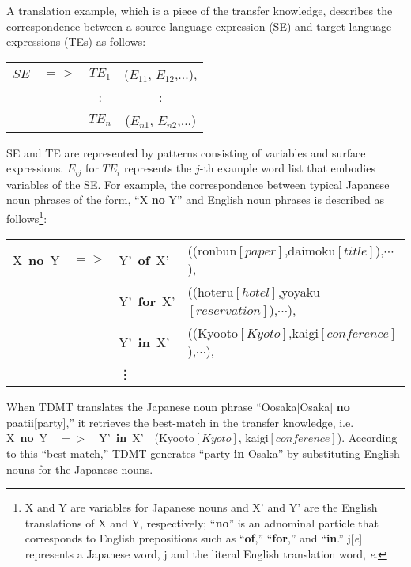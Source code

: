 A translation example, which is a piece of the transfer knowledge, 
describes the correspondence between
a source language expression (SE) and target language expressions
(TEs) as follows:

\begin{center}
\def\arraystretch{}
\begin{tabular}{cccc}
  $SE$ & $=>$ & $TE_1$ & ($E_{11}$, $E_{12}$,...), \\
     &    &  :  &  :              \\
     &    & $TE_n$ & ($E_{n1}$, $E_{n2}$,...)
\end{tabular}
\end{center}
\vspace{1ex}

SE and TE are represented by patterns consisting of 
variables and surface expressions.
 $E_{ij}$ for $TE_i$ represents the $j$-th example word list
that embodies variables of the SE.
 For example, the correspondence between
typical Japanese noun phrases of the form, ``X {\bf no}
Y'' and English noun phrases
is described as follows\footnote{X and Y are variables for Japanese
nouns and X' and Y' are the English translations of X and Y,
respectively; ``{\bf no}'' is an adnominal particle that corresponds to
 English prepositions such as ``{\bf of},'' ``{\bf for},'' and ``{\bf in}.''
j[{\it e}] represents a Japanese word, j and the literal English 
translation word, {\it  e}.}:

\begin{center}
  \begin{tabular}{ccll}
   X~{\bf no}~Y & $=>$ & Y'~{\bf of}~X'  & ((ronbun$[paper]$,daimoku$[title]$),$\cdots$),\\
                &      & Y'~{\bf for}~X' & ((hoteru$[hotel]$,yoyaku$[reservation]$),$\cdots$), \\
                &      & Y'~{\bf in}~X'  & ((Kyooto$[Kyoto]$,kaigi$[conference]$),$\cdots$),\\
                &      & \hspace*{1.3em} \vdots
  \end{tabular}
\end{center}

When TDMT translates the Japanese noun phrase 
``Oosaka[Osaka] {\bf no} paatii[party],'' it retrieves 
the best-match  in the transfer knowledge, i.e.
 X~{\bf no}~Y~~$=>$~~Y'~{\bf in}~X'~~(Kyooto$[Kyoto]$,
kaigi$[conference]$). According to this ``best-match,''
TDMT generates ``party {\bf in} Osaka'' by substituting English nouns
for the Japanese nouns.

